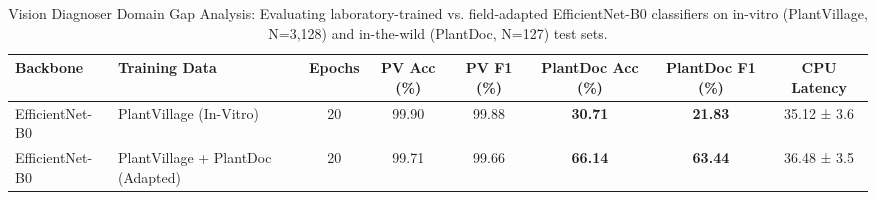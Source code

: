 \begin{table}[t]
\centering
\caption{Vision Diagnoser Domain Gap Analysis: Evaluating laboratory-trained vs. field-adapted EfficientNet-B0 classifiers on in-vitro (PlantVillage, N=3,128) and in-the-wild (PlantDoc, N=127) test sets.}
\label{tab:vision_domain_gap}
\small
\begin{tabular}{llcccccc}
\toprule
\textbf{Backbone} & \textbf{Training Data} & \textbf{Epochs} & \textbf{PV Acc (\%)} & \textbf{PV F1 (\%)} & \textbf{PlantDoc Acc (\%)} & \textbf{PlantDoc F1 (\%)} & \textbf{CPU Latency} \\
\midrule
EfficientNet-B0 & PlantVillage (In-Vitro) & 20 & 99.90 & 99.88 & \textbf{30.71} & \textbf{21.83} & 35.12 ± 3.6 \\
EfficientNet-B0 & PlantVillage + PlantDoc (Adapted) & 20 & 99.71 & 99.66 & \textbf{66.14} & \textbf{63.44} & 36.48 ± 3.5 \\
\bottomrule
\end{tabular}
\end{table}
